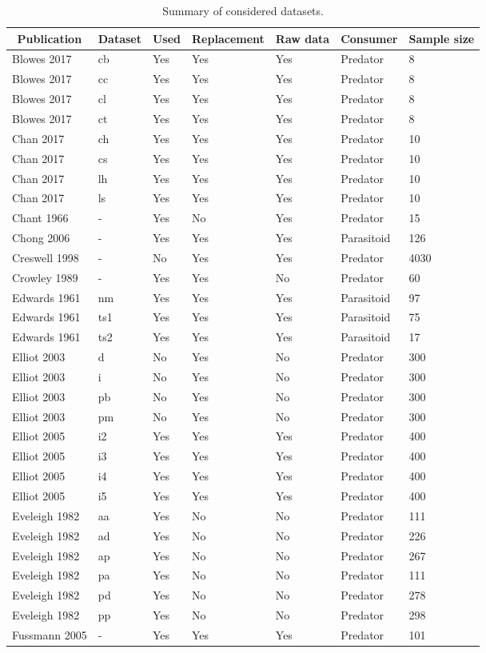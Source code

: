 \begin{table}[!tbp]
\caption{Summary of considered datasets.\label{table:datasets}} 
\begin{center}
\begin{tabular}{lllllll}
\hline\hline
\multicolumn{1}{c}{Publication}&\multicolumn{1}{c}{Dataset}&\multicolumn{1}{c}{Used}&\multicolumn{1}{c}{Replacement}&\multicolumn{1}{c}{Raw data}&\multicolumn{1}{c}{Consumer}&\multicolumn{1}{c}{Sample size}\tabularnewline
\hline
Blowes 2017&cb&Yes&Yes&Yes&Predator&8\tabularnewline
Blowes 2017&cc&Yes&Yes&Yes&Predator&8\tabularnewline
Blowes 2017&cl&Yes&Yes&Yes&Predator&8\tabularnewline
Blowes 2017&ct&Yes&Yes&Yes&Predator&8\tabularnewline
Chan 2017&ch&Yes&Yes&Yes&Predator&10\tabularnewline
Chan 2017&cs&Yes&Yes&Yes&Predator&10\tabularnewline
Chan 2017&lh&Yes&Yes&Yes&Predator&10\tabularnewline
Chan 2017&ls&Yes&Yes&Yes&Predator&10\tabularnewline
Chant 1966&-&Yes&No&Yes&Predator&15\tabularnewline
Chong 2006&-&Yes&Yes&Yes&Parasitoid&126\tabularnewline
Creswell 1998&-&No&Yes&Yes&Predator&4030\tabularnewline
Crowley 1989&-&Yes&Yes&No&Predator&60\tabularnewline
Edwards 1961&nm&Yes&Yes&Yes&Parasitoid&97\tabularnewline
Edwards 1961&ts1&Yes&Yes&Yes&Parasitoid&75\tabularnewline
Edwards 1961&ts2&Yes&Yes&Yes&Parasitoid&17\tabularnewline
Elliot 2003&d&No&Yes&No&Predator&300\tabularnewline
Elliot 2003&i&No&Yes&No&Predator&300\tabularnewline
Elliot 2003&pb&No&Yes&No&Predator&300\tabularnewline
Elliot 2003&pm&No&Yes&No&Predator&300\tabularnewline
Elliot 2005&i2&Yes&Yes&Yes&Predator&400\tabularnewline
Elliot 2005&i3&Yes&Yes&Yes&Predator&400\tabularnewline
Elliot 2005&i4&Yes&Yes&Yes&Predator&400\tabularnewline
Elliot 2005&i5&Yes&Yes&Yes&Predator&400\tabularnewline
Eveleigh 1982&aa&Yes&No&No&Predator&111\tabularnewline
Eveleigh 1982&ad&Yes&No&No&Predator&226\tabularnewline
Eveleigh 1982&ap&Yes&No&No&Predator&267\tabularnewline
Eveleigh 1982&pa&Yes&No&No&Predator&111\tabularnewline
Eveleigh 1982&pd&Yes&No&No&Predator&278\tabularnewline
Eveleigh 1982&pp&Yes&No&No&Predator&298\tabularnewline
Fussmann 2005&-&Yes&Yes&Yes&Predator&101\tabularnewline
\hline
\end{tabular}\end{center}
\end{table}

